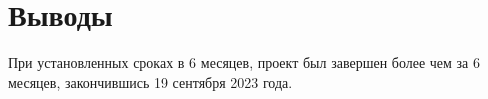 \chapter{Выводы}

При установленных сроках в 6 месяцев, проект был завершен более чем за 6 месяцев, закончившись 19 сентября 2023 года.